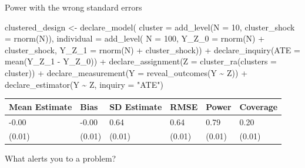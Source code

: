 \documentclass[
  11pt,
  ignorenonframetext,
]{beamer}
\newenvironment{Shaded}{\begin{snugshade}}{\end{snugshade}}
\newcommand{\AttributeTok}[1]{\textcolor[rgb]{0.40,0.45,0.13}{#1}}
\newcommand{\DecValTok}[1]{\textcolor[rgb]{0.68,0.00,0.00}{#1}}
\newcommand{\FunctionTok}[1]{\textcolor[rgb]{0.28,0.35,0.67}{#1}}
\newcommand{\NormalTok}[1]{\textcolor[rgb]{0.00,0.23,0.31}{#1}}
\newcommand{\OtherTok}[1]{\textcolor[rgb]{0.00,0.23,0.31}{#1}}
\newcommand{\SpecialCharTok}[1]{\textcolor[rgb]{0.37,0.37,0.37}{#1}}
\newcommand{\StringTok}[1]{\textcolor[rgb]{0.13,0.47,0.30}{#1}}
\begin{document}
\begin{frame}[fragile]{Power with the wrong standard errors}
\protect\hypertarget{power-with-the-wrong-standard-errors}{}
\begin{Shaded}
\begin{Highlighting}[]
\NormalTok{clustered\_design }\OtherTok{\textless{}{-}}
  \FunctionTok{declare\_model}\NormalTok{(}
    \AttributeTok{cluster =} \FunctionTok{add\_level}\NormalTok{(}\AttributeTok{N =} \DecValTok{10}\NormalTok{, }\AttributeTok{cluster\_shock =} \FunctionTok{rnorm}\NormalTok{(N)),}
    \AttributeTok{individual =} \FunctionTok{add\_level}\NormalTok{(}
        \AttributeTok{N =} \DecValTok{100}\NormalTok{,}
        \AttributeTok{Y\_Z\_0 =} \FunctionTok{rnorm}\NormalTok{(N) }\SpecialCharTok{+}\NormalTok{ cluster\_shock,}
        \AttributeTok{Y\_Z\_1 =} \FunctionTok{rnorm}\NormalTok{(N) }\SpecialCharTok{+}\NormalTok{ cluster\_shock)) }\SpecialCharTok{+}
  \FunctionTok{declare\_inquiry}\NormalTok{(}\AttributeTok{ATE =} \FunctionTok{mean}\NormalTok{(Y\_Z\_1 }\SpecialCharTok{{-}}\NormalTok{ Y\_Z\_0)) }\SpecialCharTok{+}
  \FunctionTok{declare\_assignment}\NormalTok{(}\AttributeTok{Z =} \FunctionTok{cluster\_ra}\NormalTok{(}\AttributeTok{clusters =}\NormalTok{ cluster)) }\SpecialCharTok{+}
  \FunctionTok{declare\_measurement}\NormalTok{(}\AttributeTok{Y =} \FunctionTok{reveal\_outcomes}\NormalTok{(Y }\SpecialCharTok{\textasciitilde{}}\NormalTok{ Z)) }\SpecialCharTok{+}
  \FunctionTok{declare\_estimator}\NormalTok{(Y }\SpecialCharTok{\textasciitilde{}}\NormalTok{ Z, }\AttributeTok{inquiry =} \StringTok{"ATE"}\NormalTok{)}
\end{Highlighting}
\end{Shaded}

\begin{tabular}{l|l|l|l|l|l}
\hline
Mean Estimate & Bias & SD Estimate & RMSE & Power & Coverage\\
\hline
-0.00 & -0.00 & 0.64 & 0.64 & 0.79 & 0.20\\
\hline
(0.01) & (0.01) & (0.01) & (0.01) & (0.01) & (0.01)\\
\hline
\end{tabular}

What alerts you to a problem?
\end{frame}
\end{document}
